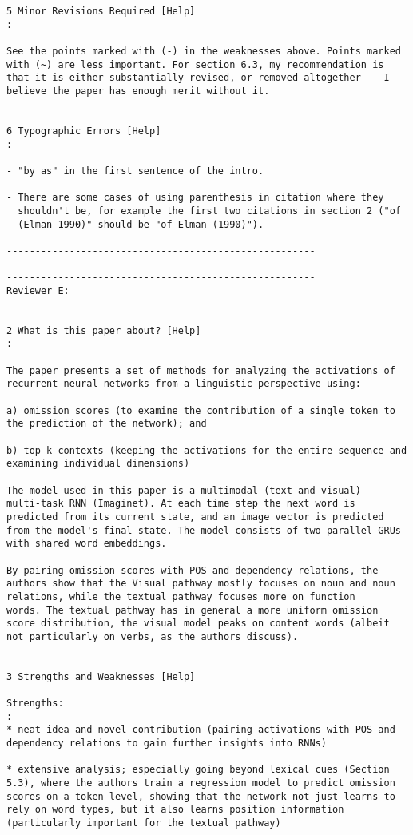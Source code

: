 \begin{verbatim}
5 Minor Revisions Required [Help]
:

See the points marked with (-) in the weaknesses above. Points marked
with (~) are less important. For section 6.3, my recommendation is
that it is either substantially revised, or removed altogether -- I
believe the paper has enough merit without it.


6 Typographic Errors [Help]
:

- "by as" in the first sentence of the intro.

- There are some cases of using parenthesis in citation where they
  shouldn't be, for example the first two citations in section 2 ("of
  (Elman 1990)" should be "of Elman (1990)").

------------------------------------------------------

------------------------------------------------------
Reviewer E:


2 What is this paper about? [Help]
: 

The paper presents a set of methods for analyzing the activations of
recurrent neural networks from a linguistic perspective using:

a) omission scores (to examine the contribution of a single token to
the prediction of the network); and

b) top k contexts (keeping the activations for the entire sequence and
examining individual dimensions)

The model used in this paper is a multimodal (text and visual)
multi-task RNN (Imaginet). At each time step the next word is
predicted from its current state, and an image vector is predicted
from the model's final state. The model consists of two parallel GRUs
with shared word embeddings.

By pairing omission scores with POS and dependency relations, the
authors show that the Visual pathway mostly focuses on noun and noun
relations, while the textual pathway focuses more on function
words. The textual pathway has in general a more uniform omission
score distribution, the visual model peaks on content words (albeit
not particularly on verbs, as the authors discuss).


3 Strengths and Weaknesses [Help]

Strengths:
: 
* neat idea and novel contribution (pairing activations with POS and
dependency relations to gain further insights into RNNs)

* extensive analysis; especially going beyond lexical cues (Section
5.3), where the authors train a regression model to predict omission
scores on a token level, showing that the network not just learns to
rely on word types, but it also learns position information
(particularly important for the textual pathway)



\end{verbatim}

